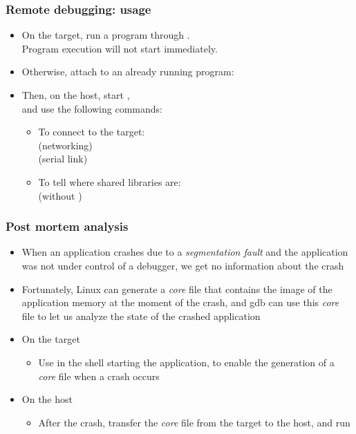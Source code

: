 \begin{frame}
  \frametitle{Remote debugging: usage}
  \begin{itemize}
  \item On the target, run a program through .\\
    Program execution will not start immediately.\\
  \item Otherwise, attach  to an already running program:\\
  \item Then, on the host, start ,\\
    and use the following  commands:
    \begin{itemize}
    \item To connect to the target:\\
       (networking)\\
       (serial link)
    \item To tell  where shared libraries are:\\
       (without )
    \end{itemize}
  \end{itemize}
\end{frame}

\begin{frame}
  \frametitle{Post mortem analysis}
  \begin{itemize}
  \item When an application crashes due to a {\em segmentation fault}
    and the application was not under control of a debugger, we get no
    information about the crash
  \item Fortunately, Linux can generate a {\em core} file that
    contains the image of the application memory at the moment of the
    crash, and gdb can use this {\em core} file to let us analyze the
    state of the crashed application
  \item On the target
    \begin{itemize}
    \item Use  in the shell starting the
    application, to enable the generation of a {\em core} file
    when a crash occurs
    \end{itemize}
  \item On the host
    \begin{itemize}
    \item After the crash, transfer the {\em core} file from the target to
      the host, and run
    \end{itemize}
  \end{itemize}
\end{frame}

